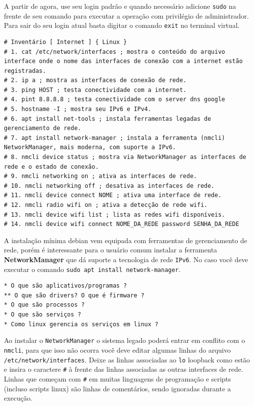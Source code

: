 \documentclass[12pt,a4paper]{article}
\begin{document}
A partir de agora, use seu login padrão e quando necessário adicione \texttt{sudo} na frente de seu comando para executar a operação com privilégio de administrador. Para sair do seu login atual basta digitar o comando \texttt{exit} no terminal virtual. \\

\begin{lstlisting}
# Inventário [ Internet ] { Linux }
# 1. cat /etc/network/interfaces ; mostra o conteúdo do arquivo interface onde o nome das interfaces de conexão com a internet estão registradas. 
# 2. ip a ; mostra as interfaces de conexão de rede.
# 3. ping HOST ; testa conectividade com a internet.
# 4. pint 8.8.8.8 ; testa conectividade com o server dns google
# 5. hostname -I ; mostra seu IPv6 e IPv4.
# 6. apt install net-tools ; instala ferramentas legadas de gerenciamento de rede.
# 7. apt install network-manager ; instala a ferramenta (nmcli) NetworkManager, mais moderna, com suporte a IPv6.
# 8. nmcli device status ; mostra via NetworkManager as interfaces de rede e o estado de conexão.
# 9. nmcli networking on ; ativa as interfaces de rede. 
# 10. nmcli networking off ; desativa as interfaces de rede. 
# 11. nmcli device connect NOME ; ativa uma interface de rede.
# 12. nmcli radio wifi on ; ativa a detecção de rede wifi.
# 13. nmcli device wifi list ; lista as redes wifi disponíveis.
# 14. nmcli device wifi connect NOME_DA_REDE password SENHA_DA_REDE 
\end{lstlisting}

\vspace{\baselineskip}

A instalação mínima debian vem equipada com ferramentas de gerenciamento de rede, porém é interessante para o usuário comum instalar a ferramenta \textbf{NetworkManager} que dá suporte a tecnologia de rede \texttt{IPv6}. No caso você deve executar o comando \texttt{sudo apt install network-manager}. \\

\begin{lstlisting}
* O que são aplicativos/programas ? 
** O que são drivers? O que é firmware ?
* O que são processos ?
* O que são serviços ?
* Como linux gerencia os serviços em linux ?
\end{lstlisting}

\vspace{\baselineskip}    

Ao instalar o \texttt{NetworkManager} o sistema legado poderá entrar em conflito com o \texttt{nmcli}, para que isso não ocorra você deve editar algumas linhas do arquivo \texttt{/etc/network/interfaces}. Deixe as linhas associadas ao \texttt{lo} loopback como estão e insira o caractere \texttt{\#} à frente das linhas associadas as outras interfaces de rede. Linhas que começam com \texttt{\#} em muitas linguagens de programação e scripts (incluso scripts linux) são linhas de comentários, sendo ignoradas durante a execução. \\
\end{document}
